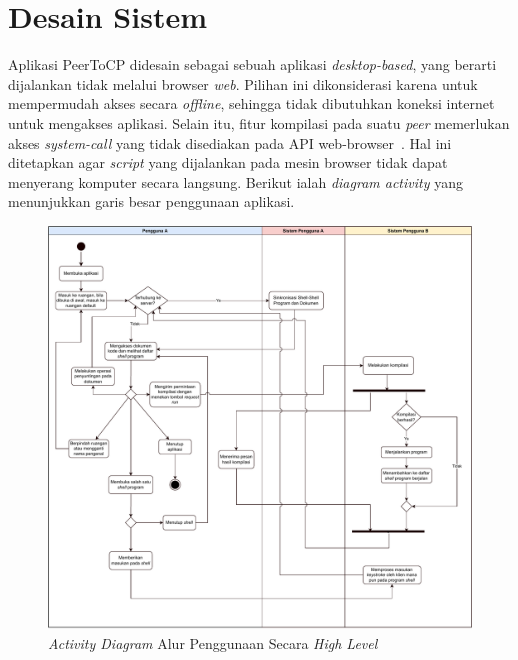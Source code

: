 \section{Desain Sistem}

Aplikasi PeerToCP didesain sebagai sebuah aplikasi \textit{desktop-based}, yang berarti dijalankan tidak melalui browser \textit{web}. Pilihan ini dikonsiderasi karena untuk mempermudah akses secara \textit{offline}, sehingga tidak dibutuhkan koneksi internet untuk mengakses aplikasi. Selain itu, fitur kompilasi pada suatu \textit{peer} memerlukan akses \textit{system-call} yang tidak disediakan pada API web-browser~\citep{v8, spidermonkey}. Hal ini ditetapkan agar \textit{script} yang dijalankan pada mesin browser tidak dapat menyerang komputer secara langsung. Berikut ialah \textit{diagram activity} yang menunjukkan garis besar penggunaan aplikasi.

\begin{figure}
    \centering
    \includegraphics[scale=0.5]{assets/skripsi/Activity_Diagram}
    \caption{\textit{Activity Diagram} Alur Penggunaan Secara \textit{High Level}}
    \label{fig:activity}
\end{figure}

